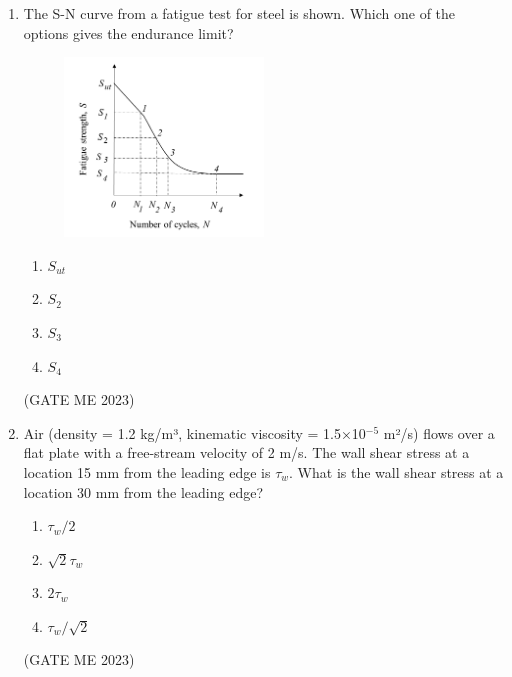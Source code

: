 \documentclass[journal]{IEEEtran}
\begin{document}
\begin{enumerate}
\item The S-N curve from a fatigue test for steel is shown. Which one of the options gives the endurance limit?
\begin{figure}[H]
\centering
\includegraphics[width=0.5\textwidth]{Fig 13.png}
\caption{}
\label{fig:question18}
\end{figure}

\begin{enumerate}
    \item $ S_{ut} $
    \item $ S_2 $
    \item $ S_3 $
    \item $ S_4 $
\end{enumerate}
\hfill (GATE ME 2023)

\item Air (density = 1.2 kg/m³, kinematic viscosity = 1.5×10$^{-5}$ m²/s) flows over a flat plate with a free-stream velocity of 2 m/s. The wall shear stress at a location 15 mm from the leading edge is $ \tau_w $. What is the wall shear stress at a location 30 mm from the leading edge?

\begin{enumerate}
    \item $ \tau_w / 2 $
    \item $ \sqrt{2} \tau_w $
    \item $ 2 \tau_w $
    \item $ \tau_w / \sqrt{2} $
\end{enumerate}
\hfill (GATE ME 2023)


\end{enumerate}
\end{document}
